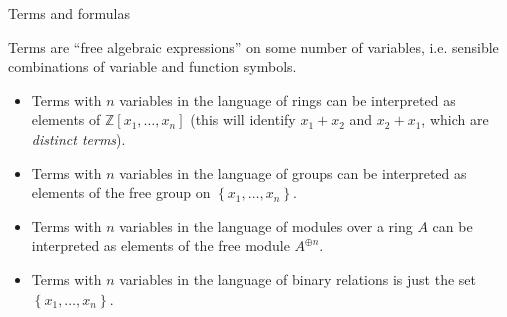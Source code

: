 \documentclass[10pt]{beamer}
\newcommand{\code}[1]{\texttt{\color{mono}#1}}
\newcommand{\set}[1]{\left\{#1\right\}}
\newcommand{\Z}{\mathbb{Z}}
\newcommand{\<}{\langle}
\renewcommand{\>}{\rangle}
\begin{document}
\begin{frame}[fragile]{Terms and formulas}

  Terms are ``free algebraic expressions'' on some number of variables,
  i.e. sensible combinations of variable and function symbols.
  \begin{itemize}[<+->]
    \item Terms with $n$ variables in the language of rings
          can be interpreted as elements of $\Z[x_{1},\dots,x_{n}]$
          (this will identify $x_{1} + x_{2}$ and $x_{2} + x_{1}$,
          which are \textit{distinct terms}).
    \item Terms with $n$ variables in the language of groups
          can be interpreted as elements of the free group on
          $\set{x_{1},\dots,x_{n}}$.
    \item Terms with $n$ variables in the language of modules
          over a ring $A$ can be interpreted as
          elements of the free module $A^{\oplus n}$.
    \item Terms with $n$ variables in the language of binary relations is
          just the set $\set{x_{1},\dots,x_{n}}$.
  \end{itemize}







\end{frame}
\end{document}
